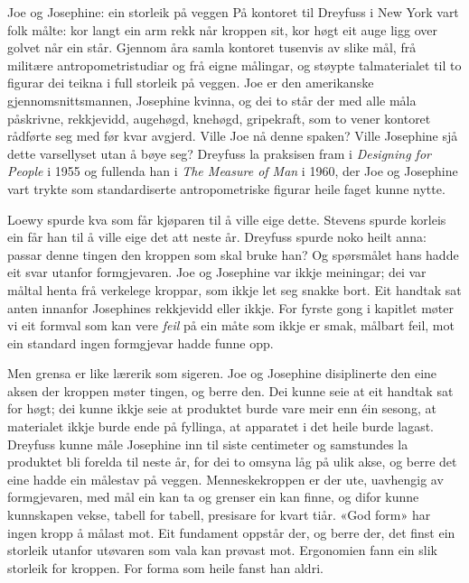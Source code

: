 \begin{kasus}{Joe og Josephine: ein storleik på veggen}
På kontoret til Dreyfuss i New York vart folk målte: kor langt ein arm rekk når kroppen sit, kor høgt eit auge ligg over golvet når ein står. Gjennom åra samla kontoret tusenvis av slike mål, frå militære antropometristudiar og frå eigne målingar, og støypte talmaterialet til to figurar dei teikna i full storleik på veggen. Joe er den amerikanske gjennomsnittsmannen, Josephine kvinna, og dei to står der med alle måla påskrivne, rekkjevidd, augehøgd, knehøgd, gripekraft, som to vener kontoret rådførte seg med før kvar avgjerd. Ville Joe nå denne spaken? Ville Josephine sjå dette varsellyset utan å bøye seg? Dreyfuss la praksisen fram i \emph{Designing for People} i 1955\autocite{dreyfuss1955} og fullenda han i \emph{The Measure of Man} i 1960, der Joe og Josephine vart trykte som standardiserte antropometriske figurar heile faget kunne nytte\autocite{dreyfuss1960measure}.
\end{kasus}

Loewy spurde kva som får kjøparen til å ville eige dette. Stevens spurde korleis ein får han til å ville eige det att neste år. Dreyfuss spurde noko heilt anna: passar denne tingen den kroppen som skal bruke han? Og spørsmålet hans hadde eit svar utanfor formgjevaren. Joe og Josephine var ikkje meiningar; dei var måltal henta frå verkelege kroppar, som ikkje let seg snakke bort. Eit handtak sat anten innanfor Josephines rekkjevidd eller ikkje. For fyrste gong i kapitlet møter vi eit formval som kan vere \emph{feil} på ein måte som ikkje er smak, målbart feil, mot ein standard ingen formgjevar hadde funne opp.

Men grensa er like lærerik som sigeren. Joe og Josephine disiplinerte den eine aksen der kroppen møter tingen, og berre den. Dei kunne seie at eit handtak sat for høgt; dei kunne ikkje seie at produktet burde vare meir enn éin sesong, at materialet ikkje burde ende på fyllinga, at apparatet i det heile burde lagast. Dreyfuss kunne måle Josephine inn til siste centimeter og samstundes la produktet bli forelda til neste år, for dei to omsyna låg på ulik akse, og berre det eine hadde ein målestav på veggen. Menneskekroppen er der ute, uavhengig av formgjevaren, med mål ein kan ta og grenser ein kan finne, og difor kunne kunnskapen vekse, tabell for tabell, presisare for kvart tiår. «God form» har ingen kropp å målast mot. Eit fundament oppstår der, og berre der, det finst ein storleik utanfor utøvaren som vala kan prøvast mot. Ergonomien fann ein slik storleik for kroppen. For forma som heile fanst han aldri.

